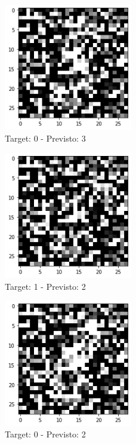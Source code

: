 \documentclass[12pt, a4paper]{article}
\begin{document}
\begin{figure}[H]
    \centering
    \caption{Target: 0 - Previsto: 3}
    \includegraphics[width=0.5\textwidth]{ErrConv2.png}
\end{figure}

\begin{figure}[H]
    \centering
    \caption{Target: 1 - Previsto: 2}
    \includegraphics[width=0.5\textwidth]{ErrConv3.png}
\end{figure}

\begin{figure}[H]
    \centering
    \caption{Target: 0 - Previsto: 2}
    \includegraphics[width=0.5\textwidth]{ErrConv4.png}
\end{figure}
\end{document}
